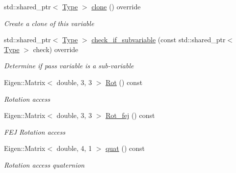 \begin{DoxyCompactItemize}
\mbox{\label{classov__type_1_1IMU_ab4a7e5d0a12a0f20b2a3a27f61201581}} 
std\+::shared\+\_\+ptr$<$ \hyperlink{classov__type_1_1Type}{Type} $>$ \hyperlink{classov__type_1_1IMU_ab4a7e5d0a12a0f20b2a3a27f61201581}{clone} () override
\begin{DoxyCompactList}\small\item\em Create a clone of this variable \end{DoxyCompactList}\item 
std\+::shared\+\_\+ptr$<$ \hyperlink{classov__type_1_1Type}{Type} $>$ \hyperlink{classov__type_1_1IMU_a3fb9631390473158abcdf97c71ea6e16}{check\+\_\+if\+\_\+subvariable} (const std\+::shared\+\_\+ptr$<$ \hyperlink{classov__type_1_1Type}{Type} $>$ check) override
\begin{DoxyCompactList}\small\item\em Determine if pass variable is a sub-\/variable \end{DoxyCompactList}\item 
\mbox{\label{classov__type_1_1IMU_a5bd26c35eb91ab19909579ad51d001a7}} 
Eigen\+::\+Matrix$<$ double, 3, 3 $>$ \hyperlink{classov__type_1_1IMU_a5bd26c35eb91ab19909579ad51d001a7}{Rot} () const
\begin{DoxyCompactList}\small\item\em Rotation access \end{DoxyCompactList}\item 
\mbox{\label{classov__type_1_1IMU_a08cc1e69a164929553d7f2f78304edd7}} 
Eigen\+::\+Matrix$<$ double, 3, 3 $>$ \hyperlink{classov__type_1_1IMU_a08cc1e69a164929553d7f2f78304edd7}{Rot\+\_\+fej} () const
\begin{DoxyCompactList}\small\item\em F\+EJ Rotation access \end{DoxyCompactList}\item 
\mbox{\label{classov__type_1_1IMU_a21a9611ca918665d55662e61a8b8464a}} 
Eigen\+::\+Matrix$<$ double, 4, 1 $>$ \hyperlink{classov__type_1_1IMU_a21a9611ca918665d55662e61a8b8464a}{quat} () const
\begin{DoxyCompactList}\small\item\em Rotation access quaternion \end{DoxyCompactList}\item 

\end{DoxyCompactItemize}
